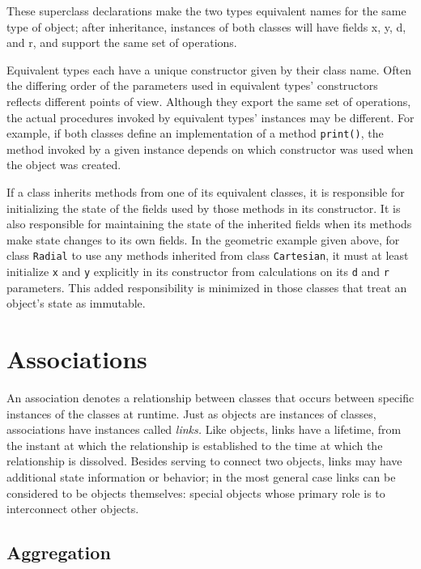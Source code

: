 These superclass declarations make the two types equivalent names for
the same type of object; after inheritance,
instances of both classes will
have fields x, y, d, and r, and support the same set of operations. 

Equivalent types each have a unique constructor
given by their class name. Often the differing order of the parameters
used in equivalent types' constructors reflects
different points of view. Although they export the same set of
operations, the actual procedures invoked by equivalent
types' instances may be different. For example, if
both classes define an implementation of a method \texttt{print()}, the
method invoked by a given instance depends on which constructor was
used when the object was created.

If a class inherits methods from one of its equivalent classes, it
is responsible for initializing the state of the fields used by
those methods in its constructor. It is also responsible for
maintaining the state of the inherited fields when its methods make
state changes to its own fields. In the geometric example given above,
for class \texttt{Radial} to use any methods inherited from class
\texttt{Cartesian}, it must at least initialize \texttt{x} and
\texttt{y} explicitly in its constructor from calculations on its
\texttt{d} and \texttt{r} parameters. This added
responsibility is minimized in those classes that treat an
object's state as immutable.

\section{Associations}

An association denotes a relationship between classes
that occurs between specific instances of the classes at runtime.
Just as objects are instances of classes, associations
have instances called \textit{links.}
Like objects, links have a lifetime, from the instant
at which the relationship is established to the time at which the
relationship is dissolved. Besides serving to connect two objects,
links may have additional state information or behavior; in the most
general case links can be considered to be objects themselves: special
objects whose primary role is to interconnect other objects.

\subsection{Aggregation}

